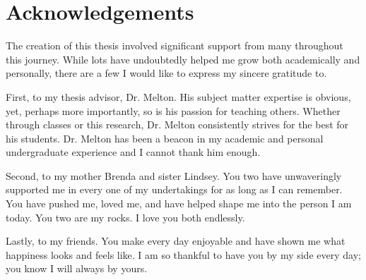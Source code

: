
\cleardoublepage
\thispagestyle{empty}

\chapter{Acknowledgements}
\noindent The creation of this thesis involved significant support from many
throughout this journey. While lots have undoubtedly helped me grow
both academically and personally, there are a few I would like to express my 
sincere gratitude to. \newline

\noindent First, to my thesis advisor, Dr. Melton. His subject matter expertise is obvious, yet, 
perhaps more importantly, so is his passion for teaching others. Whether through classes or this research,
Dr. Melton consistently strives for the best for his students. Dr. Melton has been a beacon in my academic 
and personal undergraduate experience and I cannot thank him enough. \newline

\noindent Second, to my mother Brenda and sister Lindsey. You two have unwaveringly supported me 
in every one of my undertakings for as long as I can remember. 
You have pushed me, loved me, and have helped shape me into the person I am today.
You two are my rocks. I love you both endlessly.\newline

\noindent Lastly, to my friends. You make every day enjoyable and have shown me what happiness looks and
feels like. I am so thankful to have you by my side every day; you know I will always by yours.
\cleardoublepage
